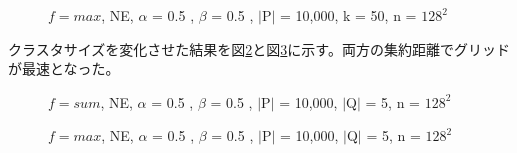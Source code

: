 \documentclass{deimj}
\begin{document}
\begin{figure}[H]
	\centering
    \caption{$f=max$, NE, $\alpha$ = 0.5 , $\beta$ = 0.5 , $\mid$P$\mid$ = 10,000, k = 50, n = $128^2$}
    \label{fig:max-querySize}
\end{figure}

クラスタサイズを変化させた結果を図\ref{fig:sum-clusterSize}と図\ref{fig:max-clusterSize}に示す。両方の集約距離でグリッドが最速となった。

\begin{figure}[H]
	\centering
    \caption{$f=sum$, NE, $\alpha$ = 0.5 , $\beta$ = 0.5 , $\mid$P$\mid$ = 10,000, $\mid$Q$\mid$ = 5, n = $128^2$}
    \label{fig:sum-clusterSize}
\end{figure}

\begin{figure}[H]
	\centering
    \caption{$f=max$, NE, $\alpha$ = 0.5 , $\beta$ = 0.5 , $\mid$P$\mid$ = 10,000, $\mid$Q$\mid$ = 5, n = $128^2$}
    \label{fig:max-clusterSize}
\end{figure}
\end{document}
